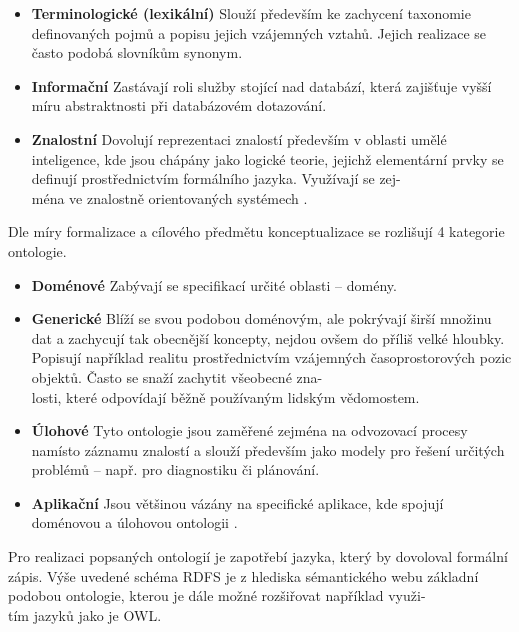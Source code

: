 \documentclass{projekt}
\begin{document}
\begin {itemize}

\item \textbf{Terminologické (lexikální)} Slouží především ke zachycení taxonomie definovaných pojmů a popisu jejich vzájemných vztahů. Jejich realizace se často podobá slovníkům synonym.
\item \textbf{Informační} Zastávají roli služby stojící nad databází, která zajišťuje vyšší míru abstraktnosti při databázovém dotazování.
\item \textbf{Znalostní} Dovolují reprezentaci znalostí především v oblasti umělé inteligence, kde jsou chápány jako logické teorie, jejichž elementární prvky se definují prostřednictvím formálního jazyka. Využívají se zej-\\ména ve znalostně orientovaných systémech \cite{_9}.

\end{itemize}

Dle míry formalizace a cílového předmětu konceptualizace se rozlišují 4 kategorie ontologie.

\begin {itemize}

\item \textbf{Doménové} Zabývají se specifikací určité oblasti – domény.
\item \textbf{Generické} Blíží se svou podobou doménovým, ale pokrývají širší množinu dat a zachycují tak obecnější koncepty, nejdou ovšem do příliš velké hloubky. Popisují například realitu prostřednictvím vzájemných časoprostorových pozic objektů. Často se snaží zachytit všeobecné zna-\\losti, které odpovídají běžně používaným lidským vědomostem.
\item \textbf{Úlohové} Tyto ontologie jsou zaměřené zejména na odvozovací procesy namísto záznamu znalostí a slouží především jako modely pro řešení určitých problémů – např. pro diagnostiku či plánování.
\item \textbf{Aplikační} Jsou většinou vázány na specifické aplikace, kde spojují doménovou a úlohovou ontologii \cite{_10}.
\end{itemize}

Pro realizaci popsaných ontologií je zapotřebí jazyka, který by dovoloval formální zápis. Výše uvedené schéma RDFS je z hlediska sémantického webu základní podobou ontologie, kterou je dále možné rozšiřovat například využi-\\tím jazyků jako je OWL.
\end{document}
